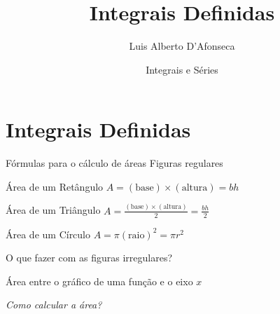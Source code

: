 
\usepackage{apresentacao}
\usepackage{mathconfig}
\usepackage{tabto}

\makeatletter
\graphicspath  {{./figs/}}
\makeatother

\title {Integrais Definidas}
\author{\large Luis Alberto D'Afonseca}
\date  {Integrais e Séries}



\begin{frame}
    \titlepage
\end{frame}

\section{Integrais Definidas}

\begin{frame}{Fórmulas para o cálculo de áreas}
  Figuras regulares

  \pause
  \vspace{1.6\baselineskip}
  Área de um Retângulo
  \tabto{45mm}
  \(
    A = (\text{base}) \times (\text{altura}) = bh
  \)

  \pause
  \vspace{1.5\baselineskip}
  Área de um Triângulo
  \tabto{45mm}
  \(
    A = \frac{(\text{base}) \times (\text{altura})}{2} = \frac{bh}{2}
  \)

  \pause
  \vspace{1.3\baselineskip}
  Área de um Círculo
  \tabto{45mm}
  \(
    A = \pi (\text{raio})^2 = \pi r^2
  \)

  \pause
  \vspace{1.4\baselineskip}
  O que fazer com as figuras irregulares?
\end{frame}

\begin{frame}{Área entre o gráfico de uma função e o eixo $x$}
  \centering
  \vspace{2\baselineskip}
  
  \pause
  \emph{Como calcular a área?}
\end{frame}

